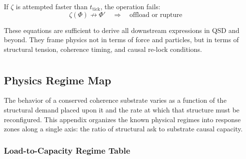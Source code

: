 \documentclass[entropy,article,submit,pdftex,moreauthors]{Definitions/mdpi}
\begin{document}
If \( \zeta \) is attempted faster than \( t_{\text{tick}} \), the operation fails:
\[
\zeta(\Phi) \not\rightarrow \Phi' \quad \Rightarrow \quad \text{offload or rupture}
\]

\vspace{1em}
These equations are sufficient to derive all downstream expressions in QSD and beyond. They frame physics not in terms of force and particles, but in terms of structural tension, coherence timing, and causal re-lock conditions.



\section[\appendixname~\thesection]{}
\subsection[\appendixname~\thesubsection]{Physics Regime Map}
\label{app:physics-regime-map}

The behavior of a conserved coherence substrate varies as a function of the structural demand placed upon it and the rate at which that structure must be reconfigured. This appendix organizes the known physical regimes into response zones along a single axis: the ratio of structural ask to substrate causal capacity.

\subsubsection{Load-to-Capacity Regime Table}
\end{document}
